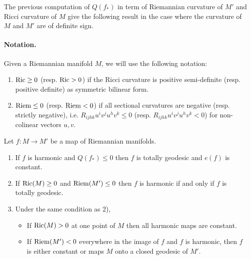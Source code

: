 The previous computation of \(Q(f_*)\) in term of Riemannian curvature of \(M'\) and
Ricci curvature of \(M\) give the following result in the case where the curvature of \(M\) and \(M'\) are of definite sign.

\paragraph{Notation.}
\label{sec:org0ef1be0}
Given a Riemannian manifold \(M\), we will use the following notation:
\begin{enumerate}
\item \({\rm Ric} \geq 0\) (resp. \({\rm Ric} > 0\)) if the Ricci curvature is positive
semi-definite (resp. positive definite) as symmetric bilinear form.
\item \({\rm Riem} \leq 0\) (resp. \({\rm Riem} < 0\)) if all sectional curvatures are
negative (resp. strictly negative), i.e. \(R_{ijhk} u^i v^j
   u^h v^k \leq 0\) (resp. \(R_{ijhk} u^i v^j
   u^h v^k < 0\)) for non-colinear vectors \(u,v\).
\end{enumerate}

\begin{corollary}
\label{cor:signed-curvature}
Let \(f: M \longrightarrow M'\) be a map of Riemannian manifolds.
\begin{enumerate}
\item If \(f\) is harmonic and \(Q(f_*) \leq 0\) then \(f\) is totally geodesic and \(e(f)\) is constant.
\item If \({\rm Ric}(M) \geq 0\) and \({\rm Riem}(M')\leq 0\) then \(f\) is harmonic if
and only if \(f\) is totally geodesic.
\item Under the same condition as 2),
\begin{itemize}
\item If \({\rm Ric}(M) >0\) at one point of \(M\) then all harmonic maps are constant.
\item If \({\rm Riem}(M') <0\) everywhere in the image of \(f\) and \(f\) is
harmonic, then \(f\) is either constant or maps \(M\) onto a closed geodesic of \(M'\).
\end{itemize}
\end{enumerate}
\end{corollary}

